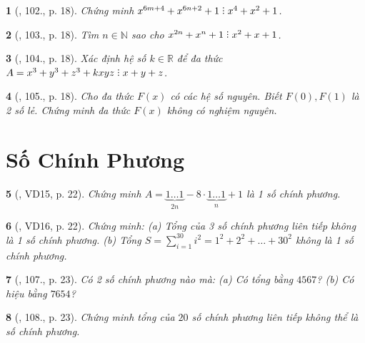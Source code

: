 \documentclass{article}
\newtheorem{baitoan}{}
\DeclareRobustCommand{\divby}{%
	\mathrel{\vbox{\baselineskip.65ex\lineskiplimit0pt\hbox{.}\hbox{.}\hbox{.}}}%
}
\begin{document}
\begin{baitoan}[\cite{Binh_Toan_8_tap_1}, 102., p. 18]
	Chứng minh $x^{6m+4} + x^{6n+2} + 1\divby x^4 + x^2 + 1$.
\end{baitoan}

\begin{baitoan}[\cite{Binh_Toan_8_tap_1}, 103., p. 18]
	Tìm $n\in\mathbb{N}$ sao cho $x^{2n} + x^n + 1\divby x^2 + x + 1$.
\end{baitoan}

\begin{baitoan}[\cite{Binh_Toan_8_tap_1}, 104., p. 18]
	Xác định hệ số $k\in\mathbb{R}$ để đa thức $A = x^3 + y^3 + z^3 + kxyz\divby x + y + z$.
\end{baitoan}

\begin{baitoan}[\cite{Binh_Toan_8_tap_1}, 105., p. 18]
	Cho đa thức $F(x)$ có các hệ số nguyên. Biết $F(0),F(1)$ là 2 số lẻ. Chứng minh đa thức $F(x)$ không có nghiệm nguyên.
\end{baitoan}


\section{Số Chính Phương}

\begin{baitoan}[\cite{Tuyen_Toan_8}, VD15, p. 22]
	Chứng minh $A = \underbrace{1\ldots1}_{2n} - 8\cdot\underbrace{1\ldots1}_n + 1$ là 1 số chính phương. 
\end{baitoan}

\begin{baitoan}[\cite{Tuyen_Toan_8}, VD16, p. 22]
	Chứng minh: (a) Tổng của 3 số chính phương liên tiếp không là 1 số chính phương. (b) Tổng $S = \sum_{i=1}^{30} i^2 = 1^2 + 2^2 + \ldots + 30^2$ không là 1 số chính phương.
\end{baitoan}

\begin{baitoan}[\cite{Tuyen_Toan_8}, 107., p. 23]
	Có 2 số chính phương nào mà: (a) Có tổng bằng $4567$? (b) Có hiệu bằng $7654$?
\end{baitoan}

\begin{baitoan}[\cite{Tuyen_Toan_8}, 108., p. 23]
	Chứng minh tổng của $20$ số chính phương liên tiếp không thể là số chính phương.
\end{baitoan}
\end{document}
